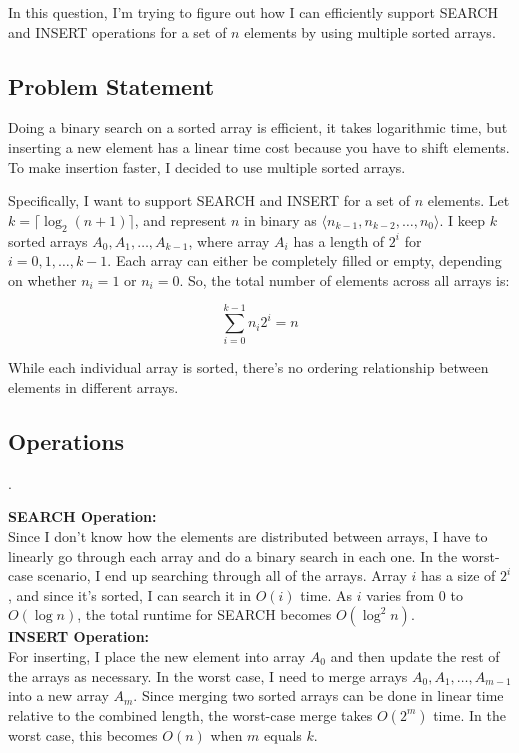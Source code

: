 \documentclass[10pt,letter,notitlepage]{article}
\begin{document}
\begin{Answer}
	
In this question, I'm trying to figure out how I can efficiently support SEARCH and INSERT operations for a set of $n$ elements by using multiple sorted arrays.

\subsection*{Problem Statement}
Doing a binary search on a sorted array is efficient, it takes logarithmic time, but inserting a new element has a linear time cost because you have to shift elements. To make insertion faster, I decided to use multiple sorted arrays.

Specifically, I want to support SEARCH and INSERT for a set of $n$ elements. Let $k = \lceil \log_2(n + 1) \rceil$, and represent $n$ in binary as $\langle n_{k-1}, n_{k-2}, \dots, n_0 \rangle$. I keep $k$ sorted arrays $A_0, A_1, \dots, A_{k-1}$, where array $A_i$ has a length of $2^i$ for $i = 0, 1, \dots, k-1$. Each array can either be completely filled or empty, depending on whether $n_i = 1$ or $n_i = 0$. So, the total number of elements across all arrays is:

\[
\sum_{i=0}^{k-1} n_i 2^i = n
\]

While each individual array is sorted, there's no ordering relationship between elements in different arrays.

\subsection*{Operations}
.

\textbf{SEARCH Operation:}\\
Since I don't know how the elements are distributed between arrays, I have to linearly go through each array and do a binary search in each one. In the worst-case scenario, I end up searching through all of the arrays. Array $i$ has a size of $2^i$, and since it's sorted, I can search it in $O(i)$ time. As $i$ varies from $0$ to $O(\log n)$, the total runtime for SEARCH becomes $O(\log^2 n)$.\\


\textbf{INSERT Operation:}\\
For inserting, I place the new element into array $A_0$ and then update the rest of the arrays as necessary. In the worst case, I need to merge arrays $A_0, A_1, \dots, A_{m-1}$ into a new array $A_m$. Since merging two sorted arrays can be done in linear time relative to the combined length, the worst-case merge takes $O(2^m)$ time. In the worst case, this becomes $O(n)$ when $m$ equals $k$.\\


\end{Answer}
\end{document}
